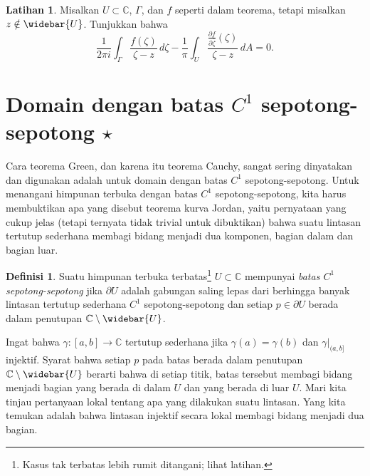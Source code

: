 \documentclass[12pt,openany]{book}
\newcommand{\C}{{\mathbb{C}}}
\newcommand{\myindex}[1]{#1\index{#1}}
\theoremstyle{plain}
\theoremstyle{remark}
\theoremstyle{definition}
\newtheorem{defn}[thm]{Definisi}
\newenvironment{exbox}{%
    \def\FrameCommand{\vrule width 1pt \relax\hspace{10pt}}%
    \MakeFramed{\advance\hsize-\width\FrameRestore}%
}{%
    \endMakeFramed
}
\theoremstyle{exercise}
\newtheorem{exercise}{Latihan}[section]
\theoremstyle{example}
\begin{document}
\begin{exbox}
\begin{exercise}
Misalkan $U \subset \C$, $\Gamma$, dan $f$ seperti dalam teorema, tetapi misalkan $z \notin
\widebar{U}$. Tunjukkan bahwa
\begin{equation*}
\frac{1}{2\pi i}
\int_{\Gamma}
\frac{f(\zeta)}{\zeta-z}
\,
d \zeta
-
\frac{1}{\pi}
\int_{U}
\frac{\frac{\partial f}{\partial \bar{\zeta}}(\zeta)}{\zeta-z}
\,
dA
= 0 .
\end{equation*}
\end{exercise}
\end{exbox}

\section{Domain dengan batas \texorpdfstring{$C^1$}{C¹} sepotong-sepotong \texorpdfstring{$\star$}{*}}

Cara teorema Green, dan karena itu teorema Cauchy, sangat sering dinyatakan dan digunakan
adalah untuk domain dengan batas
$C^1$ sepotong-sepotong. Untuk menangani himpunan terbuka dengan batas $C^1$ sepotong-sepotong, kita harus
membuktikan apa yang disebut teorema kurva Jordan, yaitu pernyataan yang cukup jelas (tetapi
ternyata tidak trivial untuk dibuktikan) bahwa suatu lintasan tertutup sederhana
membagi bidang menjadi dua komponen, bagian dalam dan bagian luar.

\begin{defn}
Suatu himpunan terbuka terbatas\footnote{Kasus tak terbatas lebih rumit ditangani; lihat latihan.}
$U \subset \C$ mempunyai
\emph{\myindex{batas $C^1$ sepotong-sepotong}} jika $\partial U$
adalah gabungan saling lepas dari berhingga banyak
lintasan tertutup sederhana $C^1$ sepotong-sepotong dan 
setiap $p \in \partial U$ berada dalam penutupan
$\C \setminus \widebar{U}$.
\end{defn}

Ingat bahwa $\gamma \colon [a,b] \to \C$ tertutup sederhana jika
$\gamma(a)=\gamma(b)$ dan $\gamma|_{(a,b]}$ injektif.
Syarat bahwa setiap $p$ pada batas berada dalam penutupan $\C
\setminus \widebar{U}$ berarti bahwa di setiap titik, batas tersebut membagi
bidang menjadi bagian yang berada di dalam $U$ dan yang berada di luar $U$. Mari kita tinjau
pertanyaan lokal tentang apa yang dilakukan suatu lintasan.
Yang kita temukan adalah bahwa lintasan injektif secara lokal membagi bidang menjadi dua bagian.
\end{document}
